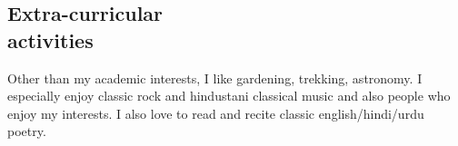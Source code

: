 \documentclass[margin,line, 9pt]{res}
\begin{document}
\begin{resume}
\section{\sc Extra-curricular \\ activities}
Other than my academic interests, I like gardening, trekking, astronomy. I especially enjoy classic rock and hindustani classical music and also people who enjoy my interests. I also love to read and recite classic english/hindi/urdu poetry.




\end{resume}
\end{document}
